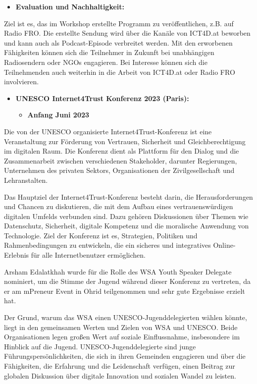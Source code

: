 \begin{itemize}
    \item \textbf{Evaluation und Nachhaltigkeit:}
\end{itemize}

Ziel ist es, das im Workshop erstellte Programm zu veröffentlichen, z.B. auf Radio FRO. Die erstellte Sendung wird über die Kanäle von ICT4D.at beworben und kann auch als Podcast-Episode verbreitet werden. Mit den erworbenen Fähigkeiten können sich die Teilnehmer in Zukunft bei unabhängigen Radiosendern oder NGOs engagieren. Bei Interesse können sich die Teilnehmenden auch weiterhin in die Arbeit von ICT4D.at oder Radio FRO involvieren.

\begin{itemize}
    \item \textbf{UNESCO Internet4Trust Konferenz 2023 (Paris):}
    \begin{itemize}
        \item \textbf{Anfang Juni 2023}
    \end{itemize}
\end{itemize}

Die von der UNESCO organisierte Internet4Trust-Konferenz ist eine Veranstaltung zur Förderung von Vertrauen, Sicherheit und Gleichberechtigung im digitalen Raum. Die Konferenz dient als Plattform für den Dialog und die Zusammenarbeit zwischen verschiedenen Stakeholder, darunter Regierungen, Unternehmen des privaten Sektors, Organisationen der Zivilgesellschaft und Lehranstalten.

Das Hauptziel der Internet4Trust-Konferenz besteht darin, die Herausforderungen und Chancen zu diskutieren, die mit dem Aufbau eines vertrauenswürdigen digitalen Umfelds verbunden sind. Dazu gehören Diskussionen über Themen wie Datenschutz, Sicherheit, digitale Kompetenz und die moralische Anwendung von Technologie. Ziel der Konferenz ist es, Strategien, Politiken und Rahmenbedingungen zu entwickeln, die ein sicheres und integratives Online-Erlebnis für alle Internetbenutzer ermöglichen.

Arsham Edalatkhah wurde für die Rolle des WSA Youth Speaker Delegate nominiert, um die Stimme der Jugend während dieser Konferenz zu vertreten, da er am mPreneur Event in Ohrid teilgenommen und sehr gute Ergebnisse erzielt hat.

Der Grund, warum das WSA einen UNESCO-Jugenddelegierten wählen könnte, liegt in den gemeinsamen Werten und Zielen von WSA und UNESCO. Beide Organisationen legen großen Wert auf soziale Einflussnahme, insbesondere im Hinblick auf die Jugend. UNESCO-Jugenddelegierte sind junge Führungspersönlichkeiten, die sich in ihren Gemeinden engagieren und über die Fähigkeiten, die Erfahrung und die Leidenschaft verfügen, einen Beitrag zur globalen Diskussion über digitale Innovation und sozialen Wandel zu leisten.

